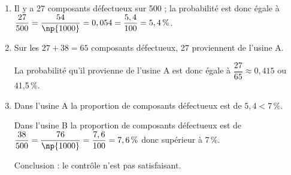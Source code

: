 
\medskip

%
%
   
\begin{enumerate}
\item %
Il y a 27 composants défectueux sur 500 ; la probabilité est donc égale à $\dfrac{27}{500} = \dfrac{54}{\np{1000}} = 0,054 = \dfrac{5,4}{100} = 5,4\,\%$. 
\item %
Sur les $27 + 38 = 65$ composants défectueux, 27 proviennent de l'usine A.

La probabilité qu'il provienne de l'usine A est donc égale à $\dfrac{27}{65} \approx 0,415$ ou 41,5\,\%.
\item %
Dans l'usine A la proportion de composants défectueux est de $5,4 < 7\,\%$.

Dans l'usine B  la proportion de composants défectueux est de $\dfrac{38}{500} = \dfrac{76}{\np{1000}} = \dfrac{7,6}{100} = 7,6\,\%$ donc supérieur à 7\,\%.

Conclusion : le contrôle n'est pas satisfaisant.
\end{enumerate}

\bigskip

